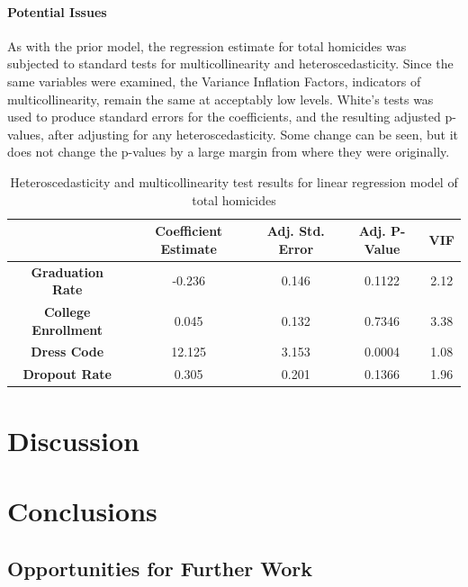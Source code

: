 \documentclass[12pt]{article}
\begin{document}
	\paragraph{Potential Issues}
	
	As with the prior model, the regression estimate for total homicides was subjected to standard tests for multicollinearity and heteroscedasticity.  Since the same variables were examined, the Variance Inflation Factors, indicators of multicollinearity, remain the same at acceptably low levels.  White's tests was used to produce standard errors for the coefficients, and the resulting adjusted p-values, after adjusting for any heteroscedasticity.  Some change can be seen, but it does not change the p-values by a large margin from where they were originally.
	\begin{center}
	\begin{table}[h]
		\begin{tabular}{ c | c | c | c | c }
			
			& \textbf{Coefficient Estimate} & \textbf{Adj. Std. Error} & \textbf{Adj. P-Value} & \textbf{VIF} \\
			\hline
			\textbf{Graduation Rate} & -0.236 & 0.146 & 0.1122 & 2.12  \\
			\textbf{College Enrollment} & 0.045 & 0.132 & 0.7346 & 3.38 \\
			\textbf{Dress Code} & 12.125 & 3.153 & 0.0004 & 1.08 \\
			\textbf{Dropout Rate} & 0.305 & 0.201 & 0.1366 & 1.96
			
		\end{tabular}
		\caption{Heteroscedasticity and multicollinearity test results for linear regression model of total homicides}
	\end{table}
\end{center}

	\section{Discussion}



	\section{Conclusions}


\subsection{Opportunities for Further Work}
\end{document}
